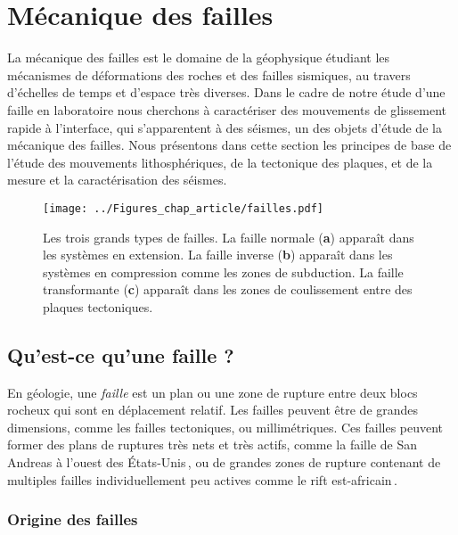 
\section{Mécanique des failles}
\label{sec:failles}






La mécanique des failles est le domaine de la géophysique étudiant les mécanismes de déformations des roches et des failles sismiques, au travers d'échelles de temps et d'espace très diverses. Dans le cadre de notre étude d'une faille en laboratoire nous cherchons à caractériser des mouvements de glissement rapide à l'interface, qui s'apparentent à des séismes, un des objets d'étude de la mécanique des failles. Nous présentons dans cette section les principes de base de l'étude des mouvements lithosphériques, de la tectonique des plaques, et de la mesure et la caractérisation des séismes.


\begin{figure}[hbt]
\centering
\texttt{[image: ../Figures\_chap\_article/failles.pdf]}
\caption[Types de failles]{Les trois grands types de failles. La faille normale (\textbf{a}) apparaît dans les systèmes en extension. La faille inverse (\textbf{b}) apparaît dans les systèmes en compression comme les zones de subduction. La faille transformante (\textbf{c}) apparaît dans les zones de coulissement entre des plaques tectoniques.}
\label{fig:typesdefailles2}
\end{figure}

\subsection{Qu'est-ce qu'une faille ?}

En géologie, une \textit{faille} est un plan ou une zone de rupture entre deux blocs rocheux qui sont en déplacement relatif. Les failles peuvent être de grandes dimensions, comme les failles tectoniques, ou millimétriques. Ces failles peuvent former des plans de ruptures très nets et très actifs, comme la faille de San Andreas à l'ouest des États-Unis\,\cite{scholz_evidence_2000}, ou de grandes zones de rupture contenant de multiples failles individuellement peu actives comme le rift est-africain\,\cite{chorowicz_east_2005}.




\subsubsection{Origine des failles}


